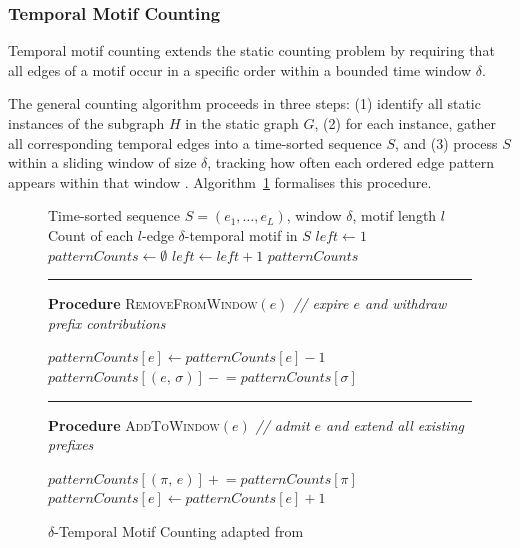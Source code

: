 \documentclass{thesisclass}
\begin{document}
\subsubsection{Temporal Motif Counting}
Temporal motif counting extends the static counting problem by requiring that all edges of a motif occur in a specific order within a bounded time window $\delta$. 

The general counting algorithm proceeds in three steps: (1) identify all
static instances of the subgraph $H$ in the static graph $G$,
(2) for each instance, gather all corresponding temporal edges into a
time-sorted sequence $S$, and (3) process $S$ within a sliding window of
size $\delta$, tracking how often each ordered edge pattern appears
within that window \citep{paranjape2017motifs}. Algorithm~\ref{alg:paranjape}
formalises this procedure.

\begin{figure}[t]
\begin{minipage}{\linewidth}

\begin{algorithm}[H]
\caption{$\delta$-Temporal Motif Counting adapted from \citet{paranjape2017motifs}}
\label{alg:paranjape}
\begin{algorithmic}[1]
\Require Time-sorted sequence $S = (e_1, \ldots, e_L)$,
         window $\delta$, motif length $l$
\Ensure Count of each $l$-edge $\delta$-temporal motif in $S$
\State $\textit{left} \gets 1$
\State $\textit{patternCounts} \gets \emptyset$
        \State {}
        \State $\textit{left} \gets \textit{left} + 1$
    \EndWhile
    \State {}
\EndFor
\State \Return $\textit{patternCounts}$
\end{algorithmic}

\noindent\rule{\linewidth}{0.4pt}
\noindent\textbf{Procedure} \textsc{RemoveFromWindow}$(e)$
\hfill\textit{// expire $e$ and withdraw prefix contributions}
\begin{algorithmic}[1]
\State $\textit{patternCounts}[e] \gets \textit{patternCounts}[e] - 1$
    \State $\textit{patternCounts}[(e,\,\sigma)]
           \mathrel{-}= \textit{patternCounts}[\sigma]$
\EndFor
\end{algorithmic}

\noindent\rule{\linewidth}{0.4pt}
\noindent\textbf{Procedure} \textsc{AddToWindow}$(e)$
\hfill\textit{// admit $e$ and extend all existing prefixes}
\begin{algorithmic}[1]
    \State $\textit{patternCounts}[(\pi,\,e)]
           \mathrel{+}= \textit{patternCounts}[\pi]$
\EndFor
\State $\textit{patternCounts}[e] \gets \textit{patternCounts}[e] + 1$
\end{algorithmic}

\end{algorithm}
\end{minipage}
\end{figure}
 
\end{document}
